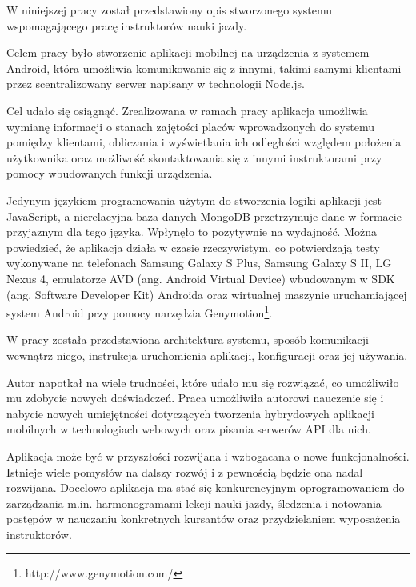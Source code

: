 \documentclass[twoside,a4paper,openright,12pt]{book}
\begin{document}
W niniejszej pracy został przedstawiony opis stworzonego systemu wspomagającego pracę instruktorów nauki jazdy.

Celem pracy było stworzenie aplikacji mobilnej na urządzenia z systemem Android, która umożliwia komunikowanie się z innymi, takimi samymi klientami przez scentralizowany serwer napisany w technologii Node.js.

Cel udało się osiągnąć. Zrealizowana w ramach pracy aplikacja umożliwia wymianę informacji o stanach zajętości placów wprowadzonych do systemu pomiędzy klientami, obliczania i wyświetlania ich odległości względem położenia użytkownika oraz możliwość skontaktowania się z innymi instruktorami przy pomocy wbudowanych funkcji urządzenia. 

Jedynym językiem programowania użytym do stworzenia logiki aplikacji jest \mbox{JavaScript}, a nierelacyjna baza danych MongoDB przetrzymuje dane w formacie przyjaznym dla tego języka. Wpłynęło to pozytywnie na wydajność. Można powiedzieć, że aplikacja działa w czasie rzeczywistym, co potwierdzają testy wykonywane na telefonach Samsung Galaxy S Plus, Samsung Galaxy S II, LG Nexus 4, emulatorze AVD (ang. Android Virtual Device) wbudowanym w SDK (ang. Software Developer Kit) Androida oraz wirtualnej maszynie uruchamiającej system Android przy pomocy narzędzia Genymotion\footnote{http://www.genymotion.com/}.

W pracy została przedstawiona architektura systemu, sposób komunikacji wewnątrz niego, instrukcja uruchomienia aplikacji, konfiguracji oraz jej używania.

Autor napotkał na wiele trudności, które udało mu się rozwiązać, co umożliwiło mu zdobycie nowych doświadczeń. Praca umożliwiła autorowi nauczenie się i nabycie nowych umiejętności dotyczących tworzenia hybrydowych aplikacji mobilnych w technologiach webowych oraz pisania serwerów API dla nich.

Aplikacja może być w przyszłości rozwijana i wzbogacana o nowe funkcjonalności. Istnieje wiele pomysłów na dalszy rozwój i z pewnością będzie ona nadal rozwijana. Docelowo aplikacja ma stać się konkurencyjnym oprogramowaniem do zarządzania m.in. harmonogramami lekcji nauki jazdy, śledzenia i notowania postępów w nauczaniu konkretnych kursantów oraz przydzielaniem wyposażenia \mbox{instruktorów}.

\backmatter

\listoffigures
\lstlistoflistings

\nocite{*}

\renewcommand{\bibname}{Literatura}

\end{document}
